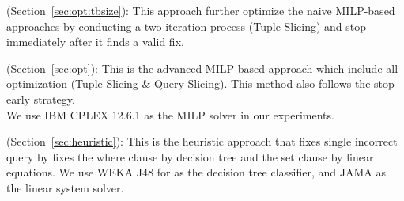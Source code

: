 {\smallskip

\noindent \milpadvtuple (Section~\ref{sec:opt:tbsize}): This approach 
further optimize the naive MILP-based approaches by conducting a two-iteration process 
(Tuple Slicing) and stop immediately after it finds a valid fix. 

\smallskip

\noindent \milpadvall (Section~\ref{sec:opt}): This is the advanced MILP-based
approach which include all optimization (Tuple Slicing \& Query Slicing). 
This method also follows the stop early strategy. 
\\
We use IBM CPLEX 12.6.1 as the MILP solver in our experiments. 

\smallskip

\noindent \heurstic (Section~\ref{sec:heuristic}): This is the heuristic approach that
fixes single incorrect query by fixes the where clause by decision tree and 
the set clause by linear equations. We use WEKA J48 for as the decision tree 
classifier, and JAMA as the linear 
system solver. 
 
}
